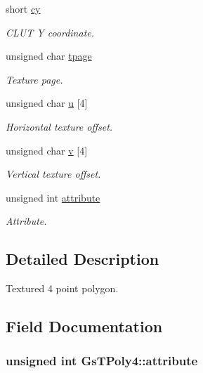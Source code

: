 \begin{DoxyCompactItemize}
short \hyperlink{structGsTPoly4_adb8d1f6369413b8c9d5393b36da40da8}{cy}
\begin{DoxyCompactList}\small\item\em C\+L\+U\+T Y coordinate. \end{DoxyCompactList}\item 
unsigned char \hyperlink{structGsTPoly4_a1a79cc052f1e999badbd984ea7860b54}{tpage}
\begin{DoxyCompactList}\small\item\em Texture page. \end{DoxyCompactList}\item 
unsigned char \hyperlink{structGsTPoly4_a92294b5e2be9cab5b87149fa8840ce77}{u} \mbox{[}4\mbox{]}
\begin{DoxyCompactList}\small\item\em Horizontal texture offset. \end{DoxyCompactList}\item 
unsigned char \hyperlink{structGsTPoly4_a76767d49028942c4e3d7aa0d54b60ee7}{v} \mbox{[}4\mbox{]}
\begin{DoxyCompactList}\small\item\em Vertical texture offset. \end{DoxyCompactList}\item 
unsigned int \hyperlink{structGsTPoly4_a4faedd0c8baf74d035520dd8c7b6ace6}{attribute}
\begin{DoxyCompactList}\small\item\em Attribute. \end{DoxyCompactList}\end{DoxyCompactItemize}


\subsection{Detailed Description}
Textured 4 point polygon. 

\subsection{Field Documentation}
\hypertarget{structGsTPoly4_a4faedd0c8baf74d035520dd8c7b6ace6}{}
\subsubsection[{attribute}]{\setlength{\rightskip}{0pt plus 5cm}unsigned int Gs\+T\+Poly4\+::attribute}\label{structGsTPoly4_a4faedd0c8baf74d035520dd8c7b6ace6}


